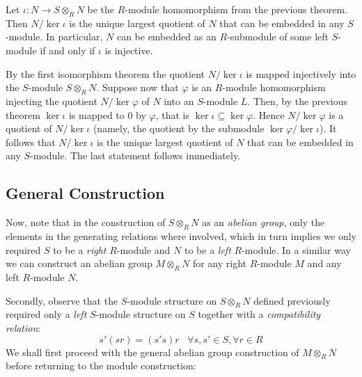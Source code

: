 \documentclass[12pt, a4paper, twoside, openright, titlepage]{book}
\begin{document}
\begin{cor}{}{}
    Let $\iota:N\rightarrow S\otimes_RN$ be the $R$-module homomorphism from the previous theorem. Then $N/\ker \iota$ is the unique largest quotient of $N$ that can be embedded in any $S$-module. In particular, $N$ can be embedded as an $R$-submodule of some left $S$-module if and only if $\iota$ is injective.
\end{cor}
\begin{proof*}{}{}
    By the first isomorphism theorem the quotient $N/\ker \iota$ is mapped injectively into the $S$-module $S\otimes_RN$. Suppose now that $\varphi$ is an $R$-module homomorphism injecting the quotient $N/\ker\varphi$ of $N$ into an $S$-module $L$. Then, by the previous theorem $\ker\iota$ is mapped to $0$ by $\varphi$, that is $\ker\iota \subseteq \ker\varphi$. Hence $N/\ker\varphi$ is a quotient of $N/\ker\iota$ (namely, the quotient by the submodule $\ker\varphi/\ker\iota$). It follows that $N/\ker\iota$ is the unique largest quotient of $N$ that can be embedded in any $S$-module. The last statement follows immediately.
\end{proof*}

\subsection{General Construction}

Now, note that in the construction of $S\otimes_RN$ as an \emph{abelian group}, only the elements in the generating relations where involved, which in turn implies we only required $S$ to be a \emph{right} $R$-module and $N$ to be a \emph{left} $R$-module. In a similar way we can construct an abelian group $M\otimes_RN$ for any right $R$-module $M$ and any left $R$-module $N$.

Secondly, observe that the $S$-module structure on $S\otimes_RN$ defined previously required only a \emph{left} $S$-module structure on $S$ together with a \emph{compatibility relation}: \begin{equation*}
    s'(sr)=(s's)r\;\;\;\forall s,s' \in S,\forall r \in R
\end{equation*}
We shall first proceed with the general abelian group construction of $M\otimes_RN$ before returning to the module construction:
\end{document}
